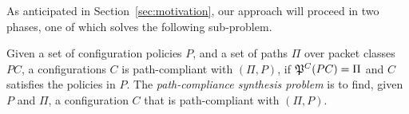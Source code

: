 As anticipated in Section~\ref{sec:motivation}, our approach will proceed in two phases,
one of which solves the following sub-problem.  
\begin{definition} \label{def:pathcompliance}
Given a set of configuration policies $P$,
and a set of paths $\Pi$ over packet classes $PC$,
	a configurations $C$ is path-compliant with 
	$(\Pi,P)$,
	if $\mathfrak{P}^C(PC)=\Pi$ and $C$ satisfies the policies in $P$.
	The \emph{path-compliance synthesis problem} is to find, given $P$ and $\Pi$,
a configuration $C$ that is path-compliant with $(\Pi,P)$.
\end{definition}






